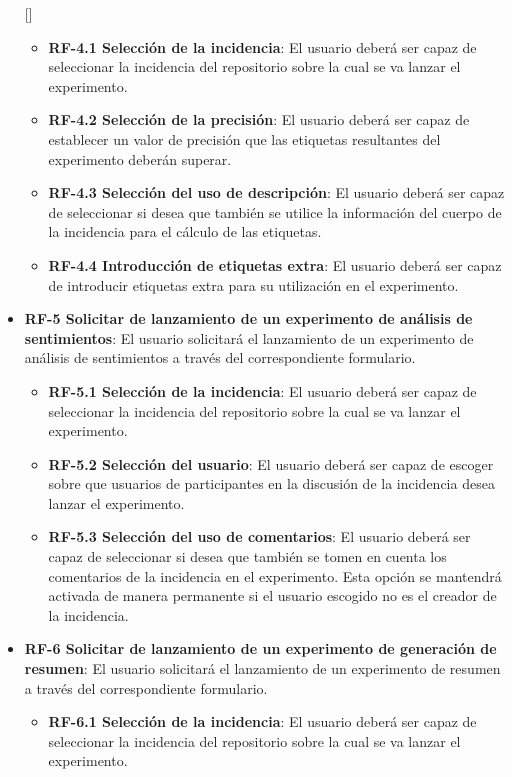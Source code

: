 \begin{itemize} [\textbullet]
    \begin{itemize} [\textbullet]
        \item \textbf{RF-4.1 Selección de la incidencia}: El usuario deberá ser capaz de seleccionar la incidencia del repositorio sobre la cual se va lanzar el experimento.
        \item \textbf{RF-4.2 Selección de la precisión}: El usuario deberá ser capaz de establecer un valor de precisión que las etiquetas resultantes del experimento deberán superar.
        \item \textbf{RF-4.3 Selección del uso de descripción}: El usuario deberá ser capaz de seleccionar si desea que también se utilice la información del cuerpo de la incidencia para el cálculo de las etiquetas.
        \item \textbf{RF-4.4 Introducción de etiquetas extra}: El usuario deberá ser capaz de introducir etiquetas extra para su utilización en el experimento.
    \end{itemize}
    \item \textbf{RF-5 Solicitar de lanzamiento de un experimento de análisis de sentimientos}: El usuario solicitará el lanzamiento de un experimento de análisis de sentimientos a través del correspondiente formulario.
    \begin{itemize} [\textbullet]
        \item \textbf{RF-5.1 Selección de la incidencia}: El usuario deberá ser capaz de seleccionar la incidencia del repositorio sobre la cual se va lanzar el experimento.
        \item \textbf{RF-5.2 Selección del usuario}: El usuario deberá ser capaz de escoger sobre que usuarios de participantes en la discusión de la incidencia desea lanzar el experimento.
        \item \textbf{RF-5.3 Selección del uso de comentarios}: El usuario deberá ser capaz de seleccionar si desea que también se tomen en cuenta los comentarios de la incidencia en el experimento. Esta opción se mantendrá activada de manera permanente si el usuario escogido no es el creador de la incidencia.
    \end{itemize}
    \item \textbf{RF-6 Solicitar de lanzamiento de un experimento de generación de resumen}: El usuario solicitará el lanzamiento de un experimento de resumen a través del correspondiente formulario.
    \begin{itemize} [\textbullet]
        \item \textbf{RF-6.1 Selección de la incidencia}: El usuario deberá ser capaz de seleccionar la incidencia del repositorio sobre la cual se va lanzar el experimento.

\end{itemize}
\end{itemize}
